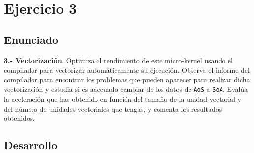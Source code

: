 \section{Ejercicio 3}
\subsection{Enunciado}
\begin{ejer}
    \textbf{3.- Vectorización.} Optimiza el rendimiento de este micro-kernel usando el compilador para vectorizar
    automáticamente su ejecución. Observa el informe del compilador para encontrar los problemas
    que pueden aparecer para realizar dicha vectorización y estudia si es adecuado cambiar de los
    datos de \texttt{AoS} a \texttt{SoA}. Evalúa la aceleración que has obtenido en función del tamaño de la unidad
    vectorial y del número de unidades vectoriales que tengas, y comenta los resultados obtenidos.
\end{ejer}
\subsection{Desarrollo}
